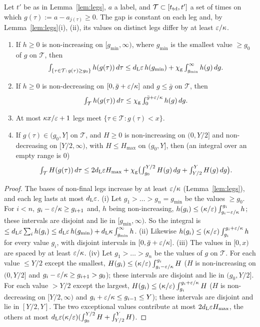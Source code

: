 \begin{lemma}\label{lem:gapint}
Let $t'$ be as in Lemma~\ref{lem:legs}, $a$ a label, and $\mathcal T\subset[t_{\mathrm{td}},t']$ a set of times on which
$g(\tau):=a-a_{j(\tau)}\ge0$. The gap is constant on each leg and, by Lemma~\ref{lem:legs}(i), (ii), its values on distinct legs
differ by at least $\varepsilon/\kappa$.
\begin{enumerate}
\item[(i)] If $h\ge0$ is non-increasing on $[g_{\min},\infty)$, where $g_{\min}$ is the smallest value $\ge g_0$ of $g$ on
$\mathcal T$, then
\[
\textstyle\int_{\{\tau\in\mathcal T:\,g(\tau)\ge g_0\}}h(g(\tau))\,d\tau\le d_{\mathrm L}\varepsilon\,h(g_{\min})+\chi_{\mathrm g}\int_{g_{\min}}^\infty h(g)\,dg .
\]
\item[(ii)] If $h\ge0$ is non-decreasing on $[0,\bar g+\varepsilon/\kappa]$ and $g\le\bar g$ on $\mathcal T$, then
\[
\textstyle\int_{\mathcal T}h(g(\tau))\,d\tau\le\chi_{\mathrm g}\int_0^{\bar g+\varepsilon/\kappa}h(g)\,dg .
\]
\item[(iii)] At most $\kappa x/\varepsilon+1$ legs meet $\{\tau\in\mathcal T:g(\tau)<x\}$.
\item[(iv)] If $g(\tau)\in(g_0,Y]$ on $\mathcal T$, and $H\ge0$ is non-increasing on $(0,Y/2]$ and non-decreasing on $[Y/2,\infty)$, with
$H\le H_{\max}$ on $(g_0,Y]$, then \textup(an integral over an empty range is $0$\textup)
\[
\textstyle\int_{\mathcal T}H(g(\tau))\,d\tau\le2d_{\mathrm L}\varepsilon H_{\max}+\chi_{\mathrm g}\bigl(\int_{g_0}^{Y/2}H(g)\,dg+\int_{Y/2}^YH(g)\,dg\bigr).
\]
\end{enumerate}
\end{lemma}

\begin{proof}
The bases of non-final legs increase by at least $\varepsilon/\kappa$ (Lemma~\ref{lem:legs}), and each leg lasts at most $d_{\mathrm L}\varepsilon$.
(i) Let $g_1>\dots>g_n=g_{\min}$ be the values $\ge g_0$. For $i<n$, $g_i-\varepsilon/\kappa\ge g_{i+1}$ and, $h$ being non-increasing,
$h(g_i)\le(\kappa/\varepsilon)\int_{g_i-\varepsilon/\kappa}^{g_i}h$; these intervals are disjoint and lie in $[g_{\min},\infty)$. So the integral is
$\le d_{\mathrm L}\varepsilon\sum_ih(g_i)\le d_{\mathrm L}\varepsilon\,h(g_{\min})+d_{\mathrm L}\kappa\int_{g_{\min}}^\infty h$. (ii) Likewise $h(g_i)\le(\kappa/\varepsilon)
\int_{g_i}^{g_i+\varepsilon/\kappa}h$ for every value $g_i$, with disjoint intervals in $[0,\bar g+\varepsilon/\kappa]$. (iii) The values in $[0,x)$
are spaced by at least $\varepsilon/\kappa$. (iv) Let $g_1>\dots>g_n$ be the values of $g$ on $\mathcal T$. For each value $\le Y/2$ except
the smallest, $H(g_i)\le(\kappa/\varepsilon)\int_{g_i-\varepsilon/\kappa}^{g_i}H$ ($H$ is non-increasing on $(0,Y/2]$ and
$g_i-\varepsilon/\kappa\ge g_{i+1}>g_0$); these intervals are disjoint and lie in $(g_0,Y/2]$. For each value $>Y/2$ except the largest,
$H(g_i)\le(\kappa/\varepsilon)\int_{g_i}^{g_i+\varepsilon/\kappa}H$ ($H$ is non-decreasing on $[Y/2,\infty)$ and $g_i+\varepsilon/\kappa\le g_{i-1}\le Y$); these
intervals are disjoint and lie in $[Y/2,Y]$. The two exceptional values contribute at most $2d_{\mathrm L}\varepsilon H_{\max}$, the others at most
$d_{\mathrm L}\varepsilon(\kappa/\varepsilon)(\int_{g_0}^{Y/2}H+\int_{Y/2}^YH)$.
\end{proof}

